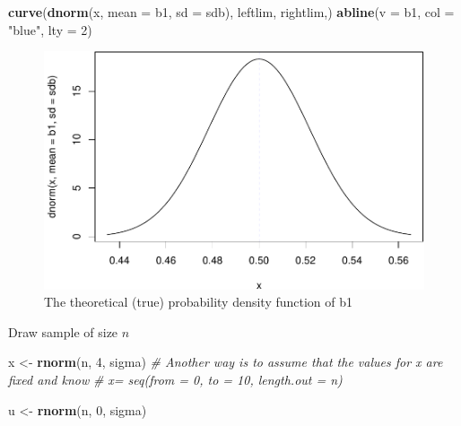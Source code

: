 \documentclass[]{book}
\newenvironment{Shaded}{\begin{snugshade}}{\end{snugshade}}
\newcommand{\CommentTok}[1]{\textcolor[rgb]{0.56,0.35,0.01}{\textit{#1}}}
\newcommand{\DataTypeTok}[1]{\textcolor[rgb]{0.13,0.29,0.53}{#1}}
\newcommand{\DecValTok}[1]{\textcolor[rgb]{0.00,0.00,0.81}{#1}}
\newcommand{\KeywordTok}[1]{\textcolor[rgb]{0.13,0.29,0.53}{\textbf{#1}}}
\newcommand{\NormalTok}[1]{#1}
\newcommand{\StringTok}[1]{\textcolor[rgb]{0.31,0.60,0.02}{#1}}
\begin{document}
\begin{Shaded}
\begin{Highlighting}[]
\KeywordTok{curve}\NormalTok{(}\KeywordTok{dnorm}\NormalTok{(x, }\DataTypeTok{mean =}\NormalTok{ b1, }\DataTypeTok{sd =}\NormalTok{ sdb), leftlim, rightlim,)}
\KeywordTok{abline}\NormalTok{(}\DataTypeTok{v =}\NormalTok{ b1, }\DataTypeTok{col =} \StringTok{"blue"}\NormalTok{, }\DataTypeTok{lty =} \DecValTok{2}\NormalTok{)}
\end{Highlighting}
\end{Shaded}

\begin{figure}

{\centering \includegraphics[width=0.8\linewidth]{MEM5220_R_files/figure-latex/fig4-1} 

}

\caption{The theoretical (true) probability density function of b1}\label{fig:fig4}
\end{figure}

Draw sample of size \(n\)

\begin{Shaded}
\begin{Highlighting}[]
\NormalTok{x <-}\StringTok{ }\KeywordTok{rnorm}\NormalTok{(n, }\DecValTok{4}\NormalTok{, sigma)}
\CommentTok{# Another way is to assume that the values for x are fixed and know}
\CommentTok{# x= seq(from = 0, to = 10, length.out = n)}
\end{Highlighting}
\end{Shaded}

\begin{Shaded}
\begin{Highlighting}[]
\NormalTok{u <-}\StringTok{ }\KeywordTok{rnorm}\NormalTok{(n, }\DecValTok{0}\NormalTok{, sigma)}
\end{Highlighting}
\end{Shaded}
\end{document}
